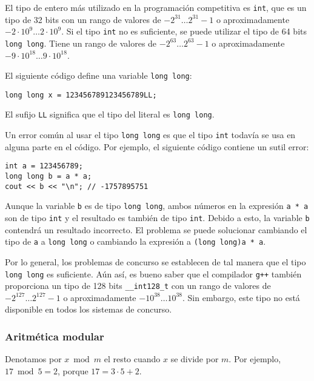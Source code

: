 
El tipo de entero más utilizado en la programación competitiva
es \texttt{int}, que es un tipo de 32 bits con
un rango de valores de $-2^{31} \ldots 2^{31}-1$
o aproximadamente $-2 \cdot 10^9 \ldots 2 \cdot 10^9$.
Si el tipo \texttt{int} no es suficiente,
se puede utilizar el tipo de 64 bits \texttt{long long}.
Tiene un rango de valores de $-2^{63} \ldots 2^{63}-1$
o aproximadamente $-9 \cdot 10^{18} \ldots 9 \cdot 10^{18}$.

El siguiente código define una
variable \texttt{long long}:
\begin{lstlisting}
long long x = 123456789123456789LL;
\end{lstlisting}
El sufijo \texttt{LL} significa que el
tipo del literal es \texttt{long long}.

Un error común al usar el tipo \texttt{long long}
es que el tipo \texttt{int} todavía se usa en alguna parte
en el código.
Por ejemplo, el siguiente código contiene
un sutil error:

\begin{lstlisting}
int a = 123456789;
long long b = a * a;
cout << b << "\n"; // -1757895751
\end{lstlisting}

Aunque la variable \texttt{b} es de tipo \texttt{long long},
ambos números en la expresión \texttt{a * a}
son de tipo \texttt{int} y el resultado es
también de tipo \texttt{int}.
Debido a esto, la variable \texttt{b} contendrá
un resultado incorrecto.
El problema se puede solucionar cambiando el tipo
de \texttt{a} a \texttt{long long} o
cambiando la expresión a \texttt{(long long)a * a}.

Por lo general, los problemas de concurso se establecen de tal manera que
el tipo \texttt{long long} es suficiente.
Aún así, es bueno saber que
el compilador \texttt{g++} también proporciona
un tipo de 128 bits \texttt{\_\_int128\_t}
con un rango de valores de
$-2^{127} \ldots 2^{127}-1$ o aproximadamente $-10^{38} \ldots 10^{38}$.
Sin embargo, este tipo no está disponible en todos los sistemas de concurso.

\subsubsection{Aritmética modular}


Denotamos por $x \bmod m$ el resto
cuando $x$ se divide por $m$.
Por ejemplo, $17 \bmod 5 = 2$,
porque $17 = 3 \cdot 5 + 2$.

